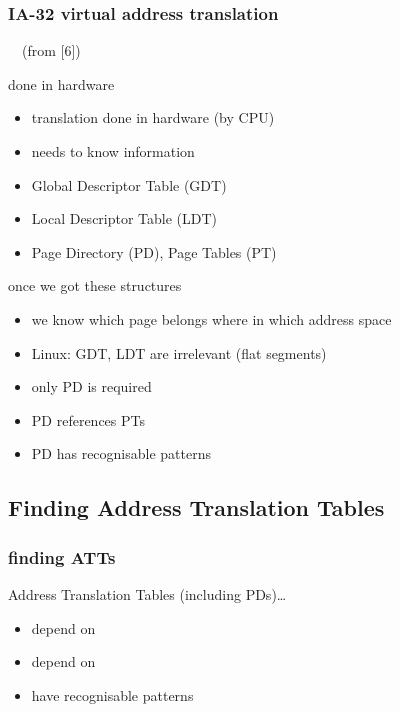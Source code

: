\documentclass{beamer}
\newenvironment{itemizeframe}[1]
  {\begin{frame}{#1}\startitemizeframe}
  {\stopitemizeframe\end{frame}}
\newcommand\startitemizeframe{\begin{itemize}}
\newcommand\stopitemizeframe{\end{itemize}}
\begin{document}
		\begin{frame} \frametitle{IA-32 virtual address translation}
			 ~~(from [6])
		\end{frame}

		\begin{itemizeframe}{done in hardware}
			\item translation done in hardware (by CPU)
			\item needs to know information
			\item Global Descriptor Table (GDT)
			\item Local Descriptor Table (LDT)
			\item Page Directory (PD), Page Tables (PT)
		\end{itemizeframe}

		\begin{itemizeframe}{once we got these structures}
			\item we know which page belongs where in which address space
			\item Linux: GDT, LDT are irrelevant (flat segments)
			\item only PD is required
			\item PD references PTs
			\item<2-> PD has recognisable patterns
		\end{itemizeframe}
	
	\subsection{Finding Address Translation Tables}
		
		\begin{frame} \frametitle{finding ATTs}
			Address Translation Tables (including PDs)\ldots
			\begin{itemize}
				\item depend on 
				\item depend on 
				\item have recognisable patterns
			\end{itemize}
		\end{frame}
\end{document}
